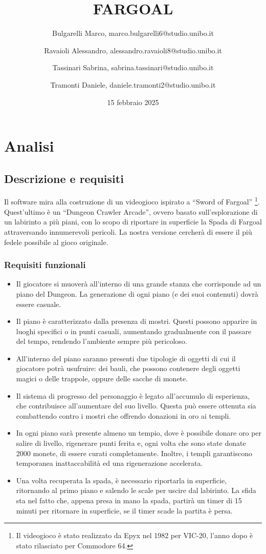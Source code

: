 \documentclass{report}
\title{FARGOAL}
\author{
    Bulgarelli Marco, marco.bulgarelli6@studio.unibo.it \and 
    Ravaioli Alessandro, alessandro.ravaioli8@studio.unibo.it \and
    Tassinari Sabrina, sabrina.tassinari@studio.unibo.it \and
    Tramonti Daniele, daniele.tramonti2@studio.unibo.it 
}
\date{15 febbraio 2025}
\begin{document}
\maketitle

\tableofcontents

\chapter{Analisi}

\section{Descrizione e requisiti}

Il software mira alla costruzione di un videogioco ispirato a “Sword of Fargoal” \footnote{
    Il videogioco è stato realizzato da Epyx nel 1982 per VIC-20, l'anno dopo è stato rilasciato per Commodore 64.
}. 
%
Quest’ultimo è un “Dungeon Crawler Arcade”, ovvero basato sull’esplorazione di un labirinto a più piani, con lo scopo di riportare in superficie la Spada di Fargoal attraversando innumerevoli pericoli. 
%
La nostra versione cercherà di essere il più fedele possibile al gioco originale.

\subsection{Requisiti funzionali}
\begin{itemize}
    \item Il giocatore si muoverà all’interno di una grande stanza che corrisponde ad un piano del Dungeon. La generazione di ogni piano (e dei suoi contenuti) dovrà essere casuale.
    \item Il piano è caratterizzato dalla presenza di mostri. Questi possono apparire in luoghi specifici o in punti casuali, aumentando gradualmente con il passare del tempo, rendendo l’ambiente sempre più pericoloso.
    \item All’interno del piano saranno presenti due tipologie di oggetti di cui il giocatore potrà usufruire: dei bauli, che possono contenere degli oggetti magici o delle trappole, oppure delle sacche di monete.
    \item Il sistema di progresso del personaggio è legato all’accumulo di esperienza, che contribuisce all’aumentare del suo livello. Questa può essere ottenuta sia combattendo contro i mostri che offrendo donazioni in oro ai templi.
    \item In ogni piano sarà presente almeno un tempio, dove è possibile donare oro per salire di livello, rigenerare punti ferita e, ogni volta che sono state donate 2000 monete, di essere curati completamente. Inoltre, i templi garantiscono temporanea inattaccabilità ed una rigenerazione accelerata.
    \item Una volta recuperata la spada, è necessario riportarla in superficie, ritornando al primo piano e salendo le scale per uscire dal labirinto. La sfida sta nel fatto che, appena presa in mano la spada, partirà un timer di 15 minuti per ritornare in superficie, se il timer scade la partita è persa.
\end{itemize}
\end{document}
